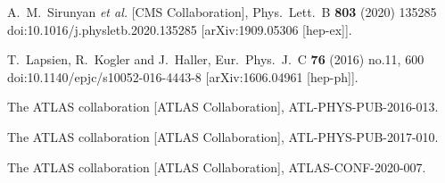 \documentclass[12pt]{article}
\begin{document}
\begin{thebibliography}{99}
  A.~M.~Sirunyan {\it et al.} [CMS Collaboration],
  Phys.\ Lett.\ B {\bf 803} (2020) 135285
  doi:10.1016/j.physletb.2020.135285
  [arXiv:1909.05306 [hep-ex]].


  T.~Lapsien, R.~Kogler and J.~Haller,
  Eur.\ Phys.\ J.\ C {\bf 76} (2016) no.11,  600
  doi:10.1140/epjc/s10052-016-4443-8
  [arXiv:1606.04961 [hep-ph]].


  The ATLAS collaboration [ATLAS Collaboration],
  ATL-PHYS-PUB-2016-013.


  The ATLAS collaboration [ATLAS Collaboration],
  ATL-PHYS-PUB-2017-010.


  The ATLAS collaboration [ATLAS Collaboration],
  ATLAS-CONF-2020-007.


\end{thebibliography}

\clearpage
\thispagestyle{empty}
\end{document}
